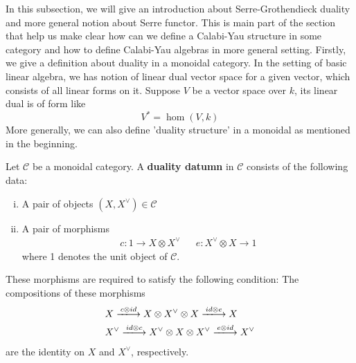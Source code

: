 In this subsection, we will give an introduction about Serre-Grothendieck duality and more general notion about Serre functor. This is main part of the section that help us make clear how can we define a Calabi-Yau structure in some category and how to define Calabi-Yau algebras in more general setting.
Firstly, we give a definition about duality in a monoidal category. In the setting of basic linear algebra, we has notion of linear dual vector space for a given vector, which consists of all linear forms on it. Suppose $V$ be a vector space over $k$, its linear dual is of form like 
\[
V^* = \hom(V,k)
\]
More generally, we can also define 'duality structure' in a monoidal as mentioned in the beginning.
\begin{mydefn}
Let $\mathcal{C}$ be a monoidal category. A \textbf{duality datumn} in $\mathcal{C}$ consists of the following data:
\begin{enumerate}[(i)]
	\item A pair of objects $(X, X^{\vee}) \in \mathcal{C}$
	\item A pair of morphisms 
	\begin{align*}
	c: 1 \rightarrow X \otimes X^{\vee}& & e: X^{\vee} \otimes X \rightarrow 1
	\end{align*}
	where 1 denotes the unit object of $\mathcal{C}$.
\end{enumerate}
These morphisms are required to satisfy the following condition:
The compositions of these morphisms 
\begin{align*}
&X \xlongrightarrow{c \otimes id} X \otimes X^{\vee} \otimes X \xlongrightarrow{id \otimes e} X\\
&X^{\vee} \xlongrightarrow{id \otimes c} X^{\vee} \otimes X \otimes X^{\vee} \xlongrightarrow{e \otimes id} X^{\vee}
\end{align*}
are the identity on $X$ and $X^{\vee}$, respectively.
\end{mydefn}